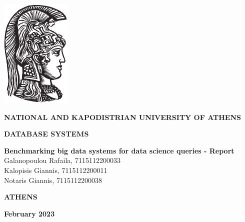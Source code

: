 %
\begin{titlepage}
    \begin{center}
    \includegraphics{emblems/athena-black}
    \end{center}
        \begin{minipage}[t]{\textwidth}
            \begin{center}
                {\large \bfseries 
                NATIONAL AND KAPODISTRIAN UNIVERSITY OF ATHENS
                }
                \hfill\linebreak\linebreak
            
                {\large \bfseries 
                DATABASE SYSTEMS
                }
                \linebreak
                \linebreak
                \hfill\linebreak

    
                {\Large \bfseries 
                Benchmarking big data systems for data science queries - Report
                }
                \linebreak\linebreak\linebreak
                \hfill\linebreak\linebreak\linebreak\linebreak
                { 
                    Galanopoulou Rafaila, 7115112200033\\
                    Kalopisis Giannis, 7115112200011\\
                    Notaris Giannis, 7115112200038
                }
        
                \hfill\linebreak\linebreak\linebreak\linebreak\linebreak
        
            \end{center}
        \end{minipage}

        \vfill
        \begin{center}
        {\bfseries 
            ATHENS
        }
        \linebreak
        
        {\bfseries
            February 2023
        }
        \end{center}
        \clearpage
\end{titlepage}

